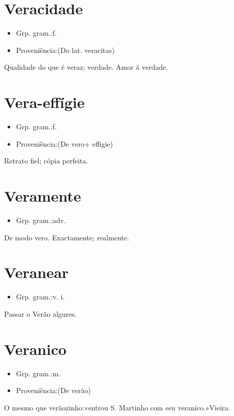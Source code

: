 \documentclass{article}
\begin{document}
\section{Veracidade}
\begin{itemize}
\item {Grp. gram.:f.}
\end{itemize}
\begin{itemize}
\item {Proveniência:(Do lat. \textunderscore veracitas\textunderscore )}
\end{itemize}
Qualidade do que é veraz; verdade.
Amor á verdade.
\section{Vera-effígie}
\begin{itemize}
\item {Grp. gram.:f.}
\end{itemize}
\begin{itemize}
\item {Proveniência:(De \textunderscore vero\textunderscore  + \textunderscore effigie\textunderscore )}
\end{itemize}
Retrato fiel; cópia perfeita.
\section{Veramente}
\begin{itemize}
\item {Grp. gram.:adv.}
\end{itemize}
De modo vero.
Exactamente; realmente.
\section{Veranear}
\begin{itemize}
\item {Grp. gram.:v. i.}
\end{itemize}
Passar o Verão algures.
\section{Veranico}
\begin{itemize}
\item {Grp. gram.:m.}
\end{itemize}
\begin{itemize}
\item {Proveniência:(De \textunderscore verão\textunderscore )}
\end{itemize}
O mesmo que \textunderscore verãozinho\textunderscore :«\textunderscore entrou S. Martinho com seu veranico.\textunderscore »Vieira.
\end{document}
